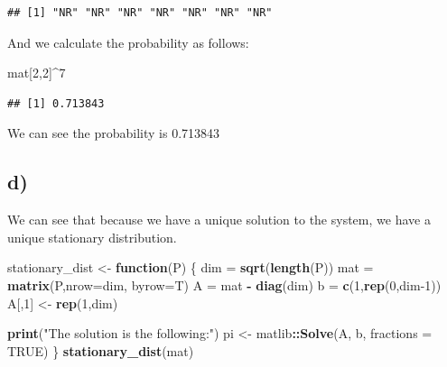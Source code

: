 \documentclass[]{article}
\newenvironment{Shaded}{\begin{snugshade}}{\end{snugshade}}
\newcommand{\ControlFlowTok}[1]{\textcolor[rgb]{0.13,0.29,0.53}{\textbf{#1}}}
\newcommand{\DataTypeTok}[1]{\textcolor[rgb]{0.13,0.29,0.53}{#1}}
\newcommand{\DecValTok}[1]{\textcolor[rgb]{0.00,0.00,0.81}{#1}}
\newcommand{\KeywordTok}[1]{\textcolor[rgb]{0.13,0.29,0.53}{\textbf{#1}}}
\newcommand{\NormalTok}[1]{#1}
\newcommand{\OperatorTok}[1]{\textcolor[rgb]{0.81,0.36,0.00}{\textbf{#1}}}
\newcommand{\OtherTok}[1]{\textcolor[rgb]{0.56,0.35,0.01}{#1}}
\newcommand{\StringTok}[1]{\textcolor[rgb]{0.31,0.60,0.02}{#1}}
\begin{document}
\begin{verbatim}
## [1] "NR" "NR" "NR" "NR" "NR" "NR" "NR"
\end{verbatim}

And we calculate the probability as follows:

\begin{Shaded}
\begin{Highlighting}[]
\NormalTok{mat[}\DecValTok{2}\NormalTok{,}\DecValTok{2}\NormalTok{]}\OperatorTok{^}\DecValTok{7}
\end{Highlighting}
\end{Shaded}

\begin{verbatim}
## [1] 0.713843
\end{verbatim}

We can see the probability is 0.713843

\hypertarget{d}{%
\subsection{d)}\label{d}}

We can see that because we have a unique solution to the system, we have
a unique stationary distribution.

\begin{Shaded}
\begin{Highlighting}[]
\NormalTok{stationary_dist <-}\StringTok{ }\ControlFlowTok{function}\NormalTok{(P) \{}
\NormalTok{    dim =}\StringTok{ }\KeywordTok{sqrt}\NormalTok{(}\KeywordTok{length}\NormalTok{(P))}
\NormalTok{    mat =}\StringTok{ }\KeywordTok{matrix}\NormalTok{(P,}\DataTypeTok{nrow=}\NormalTok{dim, }\DataTypeTok{byrow=}\NormalTok{T)}
\NormalTok{    A =}\StringTok{ }\NormalTok{mat }\OperatorTok{-}\StringTok{ }\KeywordTok{diag}\NormalTok{(dim)}
\NormalTok{    b =}\StringTok{ }\KeywordTok{c}\NormalTok{(}\DecValTok{1}\NormalTok{,}\KeywordTok{rep}\NormalTok{(}\DecValTok{0}\NormalTok{,dim}\DecValTok{-1}\NormalTok{))}
\NormalTok{    A[,}\DecValTok{1}\NormalTok{] <-}\StringTok{ }\KeywordTok{rep}\NormalTok{(}\DecValTok{1}\NormalTok{,dim)}

    \KeywordTok{print}\NormalTok{(}\StringTok{"The solution is the following:"}\NormalTok{)}
\NormalTok{    pi <-}\StringTok{ }\NormalTok{matlib}\OperatorTok{::}\KeywordTok{Solve}\NormalTok{(A, b, }\DataTypeTok{fractions =} \OtherTok{TRUE}\NormalTok{)}
\NormalTok{\}}
\KeywordTok{stationary_dist}\NormalTok{(mat)}
\end{Highlighting}
\end{Shaded}
\end{document}
